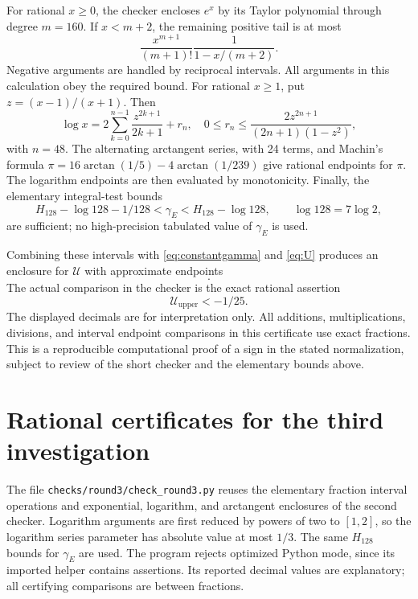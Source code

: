 \documentclass[11pt]{article}
\numberwithin{equation}{section}
\theoremstyle{definition}
\theoremstyle{remark}
\begin{document}
For rational $x\geq0$, the checker encloses $e^x$ by its Taylor
polynomial through degree $m=160$. If $x<m+2$, the remaining positive
tail is at most
\begin{equation}
\frac{x^{m+1}}{(m+1)!}\frac1{1-x/(m+2)}.
\end{equation}
Negative arguments are handled by reciprocal intervals. All arguments
in this calculation obey the required bound.
For rational $x\geq1$, put $z=(x-1)/(x+1)$. Then
\begin{equation}
\log x=2\sum_{k=0}^{n-1}\frac{z^{2k+1}}{2k+1}+r_n,
\quad 0\leq r_n\leq
\frac{2z^{2n+1}}{(2n+1)(1-z^2)},
\end{equation}
with $n=48$. The alternating arctangent series, with 24 terms, and
Machin's formula
$\pi=16\arctan(1/5)-4\arctan(1/239)$ give rational endpoints for $\pi$.
The logarithm endpoints are then evaluated by monotonicity. Finally,
the elementary integral-test bounds
\begin{equation}
H_{128}-\log128-1/128<\gamma_E<H_{128}-\log128,
\qquad \log128=7\log2,
\end{equation}
are sufficient; no high-precision tabulated value of $\gamma_E$ is used.

Combining these intervals with \eqref{eq:constantgamma} and
\eqref{eq:U} produces an enclosure for $\mathcal U$ with approximate
endpoints
\begin{equation}
[-0.0494803686403,\,-0.0409467581007].
\end{equation}
The actual comparison in the checker is the exact rational assertion
\begin{equation}
\mathcal U_{\mathrm{upper}}<-1/25.
\end{equation}
The displayed decimals are for interpretation only. All additions,
multiplications, divisions, and interval endpoint comparisons in this
certificate use exact fractions. This is a reproducible computational
proof of a sign in the stated normalization, subject to review of the
short checker and the elementary bounds above.

\section{Rational certificates for the third investigation}
\label{app:round3}

The file \texttt{checks/round3/check\_round3.py} reuses the elementary
fraction interval operations and exponential, logarithm, and arctangent
enclosures of the second checker. Logarithm arguments are first reduced
by powers of two to $[1,2]$, so the logarithm series parameter has absolute
value at most $1/3$. The same $H_{128}$ bounds for $\gamma_E$ are used.
The program rejects optimized Python mode, since its imported helper
contains assertions. Its reported decimal values are explanatory; all
certifying comparisons are between fractions.
\end{document}
